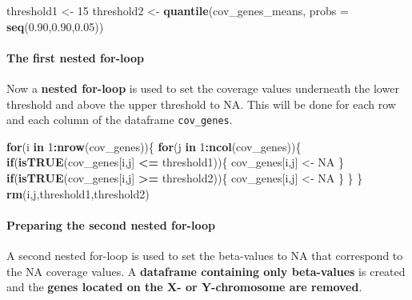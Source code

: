 \documentclass[]{article}
\newenvironment{Shaded}{\begin{snugshade}}{\end{snugshade}}
\newcommand{\KeywordTok}[1]{\textcolor[rgb]{0.13,0.29,0.53}{\textbf{#1}}}
\newcommand{\DataTypeTok}[1]{\textcolor[rgb]{0.13,0.29,0.53}{#1}}
\newcommand{\DecValTok}[1]{\textcolor[rgb]{0.00,0.00,0.81}{#1}}
\newcommand{\FloatTok}[1]{\textcolor[rgb]{0.00,0.00,0.81}{#1}}
\newcommand{\StringTok}[1]{\textcolor[rgb]{0.31,0.60,0.02}{#1}}
\newcommand{\OtherTok}[1]{\textcolor[rgb]{0.56,0.35,0.01}{#1}}
\newcommand{\ControlFlowTok}[1]{\textcolor[rgb]{0.13,0.29,0.53}{\textbf{#1}}}
\newcommand{\OperatorTok}[1]{\textcolor[rgb]{0.81,0.36,0.00}{\textbf{#1}}}
\newcommand{\NormalTok}[1]{#1}
\let\oldparagraph\paragraph
\renewcommand{\paragraph}[1]{\oldparagraph{#1}\mbox{}}
\begin{document}
\begin{Shaded}
\begin{Highlighting}[]
\NormalTok{threshold1 <-}\StringTok{ }\DecValTok{15}
\NormalTok{threshold2 <-}\StringTok{ }\KeywordTok{quantile}\NormalTok{(cov_genes_means, }\DataTypeTok{probs =} \KeywordTok{seq}\NormalTok{(}\FloatTok{0.90}\NormalTok{,}\FloatTok{0.90}\NormalTok{,}\FloatTok{0.05}\NormalTok{))}
\end{Highlighting}
\end{Shaded}

\paragraph{The first nested for-loop}\label{the-first-nested-for-loop}

Now a \textbf{nested for-loop} is used to set the coverage values
underneath the lower threshold and above the upper threshold to NA. This
will be done for each row and each column of the dataframe
\texttt{cov\_genes}.

\begin{Shaded}
\begin{Highlighting}[]
\ControlFlowTok{for}\NormalTok{(i }\ControlFlowTok{in} \DecValTok{1}\OperatorTok{:}\KeywordTok{nrow}\NormalTok{(cov_genes))\{}
  \ControlFlowTok{for}\NormalTok{(j }\ControlFlowTok{in} \DecValTok{1}\OperatorTok{:}\KeywordTok{ncol}\NormalTok{(cov_genes))\{}
    \ControlFlowTok{if}\NormalTok{(}\KeywordTok{isTRUE}\NormalTok{(cov_genes[i,j] }\OperatorTok{<=}\StringTok{ }\NormalTok{threshold1))\{}
\NormalTok{      cov_genes[i,j] <-}\StringTok{ }\OtherTok{NA}
\NormalTok{    \} }
    \ControlFlowTok{if}\NormalTok{(}\KeywordTok{isTRUE}\NormalTok{(cov_genes[i,j] }\OperatorTok{>=}\StringTok{ }\NormalTok{threshold2))\{}
\NormalTok{      cov_genes[i,j] <-}\StringTok{ }\OtherTok{NA}
\NormalTok{    \}}
\NormalTok{  \}}
\NormalTok{\}}
\KeywordTok{rm}\NormalTok{(i,j,threshold1,threshold2)}
\end{Highlighting}
\end{Shaded}

\paragraph{Preparing the second nested
for-loop}\label{preparing-the-second-nested-for-loop}

A second nested for-loop is used to set the beta-values to NA that
correspond to the NA coverage values. A \textbf{dataframe containing
only beta-values} is created and the \textbf{genes located on the X- or
Y-chromosome are removed}.
\end{document}
